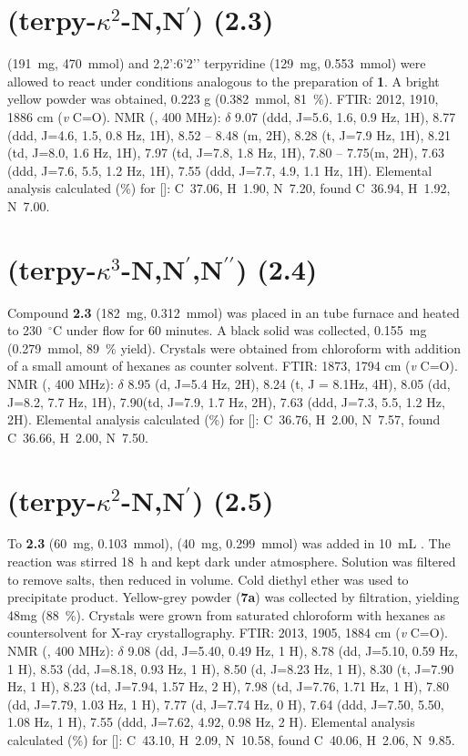 \section{(terpy-$\kappa^2$-N,N$^\prime$) (\textbf{2.3})}\label{sec.c3}
 (191~mg, 470~mmol) and 2,2’:6’2’’ terpyridine (129~mg, 0.553~mmol) were allowed to react under conditions analogous to the preparation of \textbf{1}. A bright yellow powder was obtained, 0.223 g (0.382~mmol, 81~\%). FTIR: 2012, 1910, 1886 cm (\textit{v} C=O).  NMR (, 400 MHz): $\delta$ 9.07 (ddd, J=5.6, 1.6, 0.9 Hz, 1H), 8.77 (ddd, J=4.6, 1.5, 0.8 Hz, 1H), 8.52 – 8.48 (m, 2H), 8.28 (t, J=7.9 Hz, 1H), 8.21 (td, J=8.0, 1.6 Hz, 1H), 7.97 (td, J=7.8, 1.8 Hz, 1H), 7.80 – 7.75(m, 2H), 7.63 (ddd, J=7.6, 5.5, 1.2 Hz, 1H), 7.55 (ddd, J=7.7, 4.9, 1.1 Hz, 1H). Elemental analysis calculated (\%) for []: C~37.06, H~1.90, N~7.20, found C~36.94, H~1.92, N~7.00.  

\section{(terpy-$\kappa^3$-N,N$^\prime$,N$^{\prime \prime}$) (\textbf{2.4})}\label{sec.c4}
Compound \textbf{2.3} (182~mg, 0.312~mmol) was placed in an tube furnace and heated to 230~$^\circ$C under  flow for 60 minutes. A black solid was collected, 0.155~mg (0.279~mmol, 89~\% yield). Crystals were obtained from chloroform with addition of a small amount of hexanes as counter solvent. FTIR: 1873, 1794 cm (\textit{v} C=O).  NMR (, 400 MHz): $\delta$ 8.95 (d, J=5.4 Hz, 2H), 8.24 (t, J = 8.1Hz, 4H), 8.05 (dd, J=8.2, 7.7 Hz, 1H), 7.90(td, J=7.9, 1.7 Hz, 2H), 7.63 (ddd, J=7.3, 5.5, 1.2 Hz, 2H). Elemental analysis calculated (\%) for []: C~36.76, H~2.00, N~7.57, found C~36.66, H~2.00, N~7.50.

\section{(terpy-$\kappa^2$-N,N$^\prime$) (\textbf{2.5})} \label{sec.c5}
To \textbf{2.3} (60~mg, 0.103~mmol),  (40~mg, 0.299~mmol) was added in 10~mL . The reaction was stirred 18~h and kept dark under  atmosphere. Solution was filtered to remove salts, then reduced in volume. Cold diethyl ether was used to precipitate product. Yellow-grey powder (\textbf{7a}) was collected by filtration, yielding 48mg (88~\%). Crystals were grown from saturated chloroform with hexanes as countersolvent for X-ray crystallography. FTIR: 2013, 1905, 1884 cm (\textit{v} C=O).  NMR (, 400 MHz): $\delta$ 9.08 (dd, J=5.40, 0.49 Hz, 1 H), 8.78 (dd, J=5.10, 0.59 Hz, 1 H), 8.53 (dd, J=8.18, 0.93 Hz, 1 H), 8.50 (d, J=8.23 Hz, 1 H), 8.30 (t, J=7.90 Hz, 1 H), 8.23 (td, J=7.94, 1.57 Hz, 2 H), 7.98 (td, J=7.76, 1.71 Hz, 1 H), 7.80 (dd, J=7.79, 1.03 Hz, 1 H), 7.77 (d, J=7.74 Hz, 0 H), 7.64 (ddd, J=7.50, 5.50, 1.08 Hz, 1 H), 7.55 (ddd, J=7.62, 4.92, 0.98 Hz, 2 H).  Elemental analysis calculated (\%) for []: C~43.10, H~2.09, N~10.58, found C~40.06, H~2.06, N~9.85.

